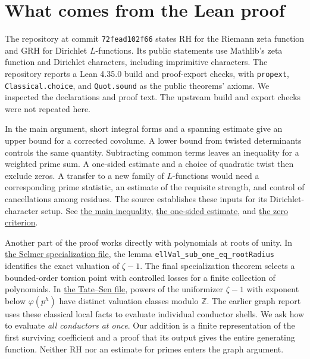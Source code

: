 \documentclass[11pt,letterpaper]{article}
\newcommand{\Z}{\mathbb Z}\newcommand{\Q}{\mathbb Q}\newcommand{\F}{\mathbb F}
\newcommand{\leanfile}[2]{\href{https://github.com/lsernau/grh-lean/blob/72fead102f663d5c7a407964a13dc0cf9d977207/grh/src/#1}{#2}}
\begin{document}
\section{What comes from the Lean proof}
The repository at commit \texttt{72fead102f66} states RH for the Riemann zeta function and GRH for Dirichlet $L$-functions. Its public statements use Mathlib's zeta function and Dirichlet characters, including imprimitive characters. The repository reports a Lean 4.35.0 build and proof-export checks, with \texttt{propext}, \texttt{Classical.choice}, and \texttt{Quot.sound} as the public theorems' axioms. We inspected the declarations and proof text. The upstream build and export checks were not repeated here. \cite{repo}

In the main argument, short integral forms and a spanning estimate give an upper bound for a corrected covolume. A lower bound from twisted determinants controls the same quantity. Subtracting common terms leaves an inequality for a weighted prime sum. A one-sided estimate and a choice of quadratic twist then exclude zeros. A transfer to a new family of $L$-functions would need a corresponding prime statistic, an estimate of the requisite strength, and control of cancellations among residues. The source establishes these inputs for its Dirichlet-character setup. See \leanfile{New/Reduction/MainInequality.lean}{the main inequality}, \leanfile{New/Reduction/OneSidedBound.lean}{the one-sided estimate}, and \leanfile{New/Reduction/Zeros/Criterion.lean}{the zero criterion}.

Another part of the proof works directly with polynomials at roots of unity. In \leanfile{New/Congruences/Selmer/RootsOfUnity.lean}{the Selmer specialization file}, the lemma \texttt{ellVal\_sub\_one\_eq\_rootRadius} identifies the exact valuation of $\zeta-1$. The final specialization theorem selects a bounded-order torsion point with controlled losses for a finite collection of polynomials. In \leanfile{Lib/PadicHodge/TateSen.lean}{the Tate--Sen file}, powers of the uniformizer $\zeta-1$ with exponent below $\varphi(p^h)$ have distinct valuation classes modulo $\Z$. The earlier graph report uses these classical local facts to evaluate individual conductor shells. We ask how to evaluate \emph{all conductors at once}. Our addition is a finite representation of the first surviving coefficient and a proof that its output gives the entire generating function. Neither RH nor an estimate for primes enters the graph argument.






\end{document}
